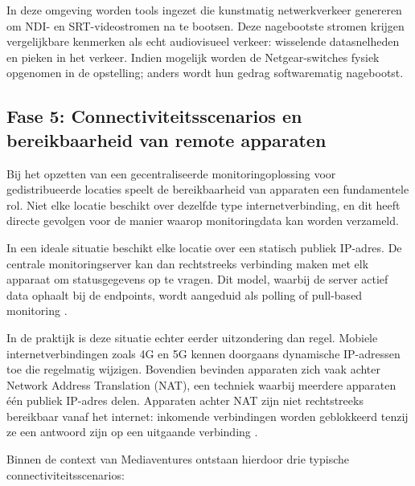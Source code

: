 In deze omgeving worden tools ingezet die kunstmatig netwerkverkeer genereren om NDI- en SRT-videostromen na te bootsen. Deze nagebootste stromen krijgen vergelijkbare kenmerken als echt audiovisueel verkeer: wisselende datasnelheden en pieken in het verkeer. Indien mogelijk worden de Netgear-switches fysiek opgenomen in de opstelling; anders wordt hun gedrag softwarematig nagebootst.

\subsection{Fase 5: Connectiviteitsscenarios en bereikbaarheid van remote apparaten}

Bij het opzetten van een gecentraliseerde monitoringoplossing voor gedistribueerde locaties speelt de bereikbaarheid van apparaten een fundamentele rol. Niet elke locatie beschikt over dezelfde type internetverbinding, en dit heeft directe gevolgen voor de manier waarop monitoringdata kan worden verzameld.

In een ideale situatie beschikt elke locatie over een statisch publiek IP-adres. De centrale monitoringserver kan dan rechtstreeks verbinding maken met elk apparaat om statusgegevens op te vragen. Dit model, waarbij de server actief data ophaalt bij de endpoints, wordt aangeduid als polling of pull-based monitoring \autocite{Ligus2012}.

In de praktijk is deze situatie echter eerder uitzondering dan regel. Mobiele internetverbindingen zoals 4G en 5G kennen doorgaans dynamische IP-adressen toe die regelmatig wijzigen. Bovendien bevinden apparaten zich vaak achter Network Address Translation (NAT), een techniek waarbij meerdere apparaten één publiek IP-adres delen. Apparaten achter NAT zijn niet rechtstreeks bereikbaar vanaf het internet: inkomende verbindingen worden geblokkeerd tenzij ze een antwoord zijn op een uitgaande verbinding \autocite{Srisuresh1999}.

Binnen de context van Mediaventures ontstaan hierdoor drie typische connectiviteitsscenarios:

